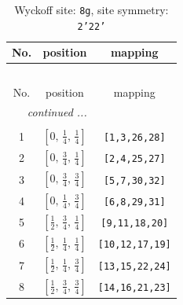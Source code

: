 \documentclass[fleqn,8pt]{jsarticle}
\begin{document}
\begin{longtable}{ccc}
\caption{Wyckoff site: {\tt 8g}, site symmetry: {\tt 2'22'}}
 \\
 \hline \hline
No. & position & mapping \\ \hline \endfirsthead

\multicolumn{2}{l}{\tablename\ \thetable{}} \\
 \hline \hline
No. & position & mapping \\ \hline \endhead

 \hline \hline
\multicolumn{2}{r}{\footnotesize\it continued ...} \\ \endfoot

 \hline \hline
\multicolumn{2}{r}{} \\ \endlastfoot

1 & $\left[ 0,\, \frac{1}{4},\, \frac{1}{4} \right]$ & {\tt [1,3,26,28]} \\ \hline
2 & $\left[ 0,\, \frac{3}{4},\, \frac{1}{4} \right]$ & {\tt [2,4,25,27]} \\ \hline
3 & $\left[ 0,\, \frac{3}{4},\, \frac{3}{4} \right]$ & {\tt [5,7,30,32]} \\ \hline
4 & $\left[ 0,\, \frac{1}{4},\, \frac{3}{4} \right]$ & {\tt [6,8,29,31]} \\ \hline
5 & $\left[ \frac{1}{2},\, \frac{3}{4},\, \frac{1}{4} \right]$ & {\tt [9,11,18,20]} \\ \hline
6 & $\left[ \frac{1}{2},\, \frac{1}{4},\, \frac{1}{4} \right]$ & {\tt [10,12,17,19]} \\ \hline
7 & $\left[ \frac{1}{2},\, \frac{1}{4},\, \frac{3}{4} \right]$ & {\tt [13,15,22,24]} \\ \hline
8 & $\left[ \frac{1}{2},\, \frac{3}{4},\, \frac{3}{4} \right]$ & {\tt [14,16,21,23]} \\
\end{longtable}
\renewcommand{\arraystretch}{1.2}
\end{document}
